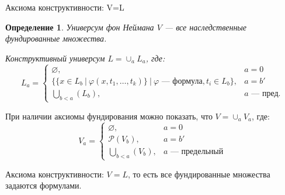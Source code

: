 \documentclass[aspectratio=169]{beamer}
\newtheorem{dfn}{Определение}[section]
\begin{document}
\begin{frame}{Аксиома конструктивности: V=L}

\begin{dfn}
\emph{Универсум фон Неймана} $V$ --- все наследственные фундированные множества.

Конструктивный универсум $L = \cup_a L_a$, где:
$$L_a = \left\{\begin{array}{ll}
    \varnothing, & a=0\\
    \{ \{ x\in L_b\ |\ \varphi(x,t_1,\dots,t_k) \}\ |\ \varphi\text{ --- формула}, t_i \in L_b\}, & a = b'\\
    \bigcup_{b < a}(L_b), & a \text{ --- пред.}
\end{array}\right.$$
\end{dfn}


\vspace{-0.3cm}При наличии аксиомы фундирования можно показать, что $V = \cup_a V_a$, где:
$$V_a = \left\{\begin{array}{ll}
    \varnothing, & a=0\\
    \mathcal{P}(V_b), & a = b'\\
    \bigcup_{b < a}(V_b), & a \text{ --- предельный}
\end{array}\right.$$

Аксиома конструктивности: $V=L$, то есть все фундированные множества задаются формулами.


\end{frame}



%

%
%
%
\end{document}
